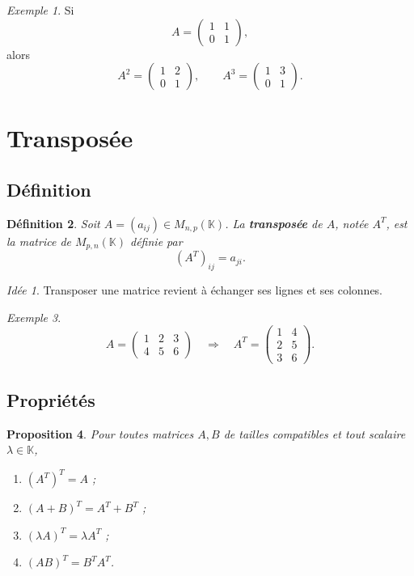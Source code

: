 \documentclass[11pt,a4paper]{article}
\newtheorem{definition}{Définition}[section]
\newtheorem{proposition}[definition]{Proposition}
\theoremstyle{remark}
\newtheorem{exemple}[definition]{Exemple}
\newtheorem*{idee}{Idée}
\newcommand{\K}{\mathbb{K}}
\begin{document}
\begin{exemple}
Si
\[
A=
\begin{pmatrix}
1 & 1\\
0 & 1
\end{pmatrix},
\]
alors
\[
A^2=
\begin{pmatrix}
1 & 2\\
0 & 1
\end{pmatrix},
\qquad
A^3=
\begin{pmatrix}
1 & 3\\
0 & 1
\end{pmatrix}.
\]
\end{exemple}

\section{Transposée}

\subsection{Définition}

\begin{definition}
Soit \(A=(a_{ij})\in M_{n,p}(\K)\).  
La \textbf{transposée} de \(A\), notée \(A^T\), est la matrice de \(M_{p,n}(\K)\) définie par
\[
(A^T)_{ij}=a_{ji}.
\]
\end{definition}

\begin{idee}
Transposer une matrice revient à échanger ses lignes et ses colonnes.
\end{idee}

\begin{exemple}
\[
A=
\begin{pmatrix}
1 & 2 & 3\\
4 & 5 & 6
\end{pmatrix}
\quad \Longrightarrow \quad
A^T=
\begin{pmatrix}
1 & 4\\
2 & 5\\
3 & 6
\end{pmatrix}.
\]
\end{exemple}

\subsection{Propriétés}

\begin{proposition}
Pour toutes matrices \(A,B\) de tailles compatibles et tout scalaire \(\lambda\in\K\),
\begin{enumerate}[label=\arabic*)]
    \item \((A^T)^T=A\) ;
    \item \((A+B)^T=A^T+B^T\) ;
    \item \((\lambda A)^T=\lambda A^T\) ;
    \item \((AB)^T=B^TA^T\).
\end{enumerate}
\end{proposition}
\end{document}
